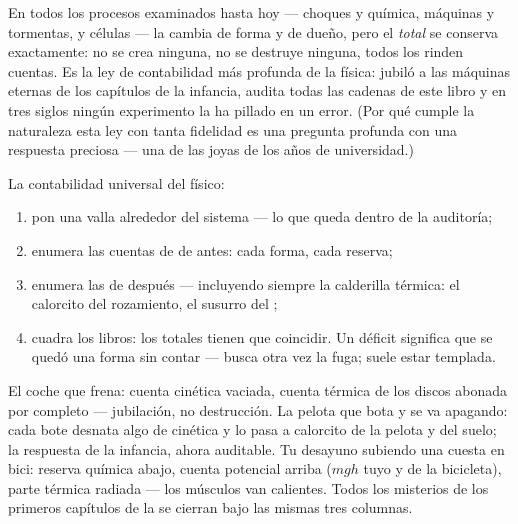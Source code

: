 \begin{proposition}\label{prop:g9:energy-conversions:conservation}
En todos los procesos examinados hasta hoy --- choques y química,
máquinas y tormentas,  y células --- la
 cambia de forma y de dueño, pero el \emph{total} se
conserva exactamente: no se crea ninguna, no se destruye ninguna, todos
los  rinden cuentas. Es la ley de contabilidad más profunda
de la física: jubiló a las máquinas eternas de los capítulos de la
infancia, audita todas las cadenas de este libro y en tres siglos
ningún experimento la ha pillado en un error. (Por qué cumple la
naturaleza esta ley con tanta fidelidad es una pregunta profunda con
una respuesta preciosa --- una de las joyas de los años de
universidad.)
\end{proposition}

\begin{method}\label{met:g9:energy-conversions:audit}
La contabilidad universal del físico:
\begin{enumerate}
  \item pon una valla alrededor del sistema --- lo que queda dentro
        de la auditoría;
  \item enumera las cuentas de  de antes: cada forma,
        cada reserva;
  \item enumera las de después --- incluyendo siempre la calderilla
        térmica: el calorcito del rozamiento, el susurro del
        ;
  \item cuadra los libros: los totales tienen que coincidir. Un
        déficit significa que se quedó una forma sin contar --- busca
        otra vez la fuga; suele estar templada.
\end{enumerate}
\end{method}

\begin{example}\label{ex:g9:energy-conversions:audits}
El coche que frena: cuenta cinética vaciada, cuenta térmica de los
discos abonada por completo --- jubilación, no destrucción. La pelota
que bota y se va apagando: cada bote desnata algo de cinética y lo pasa
a calorcito de la pelota y del suelo; la respuesta de la infancia, ahora
auditable. Tu desayuno subiendo una cuesta en bici: reserva química
abajo, cuenta potencial arriba ($m g h$ tuyo y de la bicicleta), parte
térmica radiada --- los músculos van calientes. Todos los misterios de
los primeros capítulos de la  se cierran bajo las mismas tres
columnas.
\end{example}

